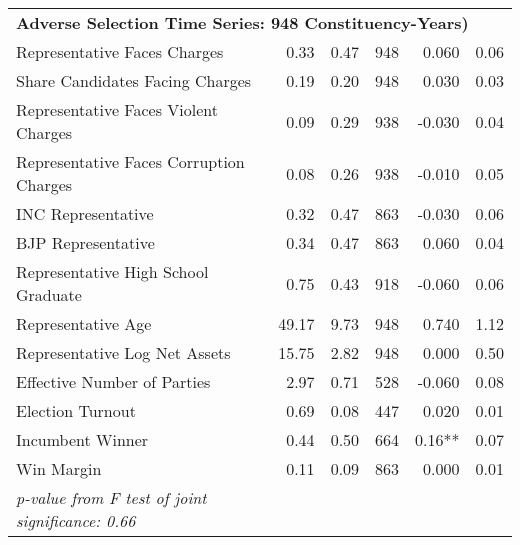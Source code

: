 \begin{tabular}{l r r r r r}
\hline
\multicolumn{6}{l}{\textbf{Adverse Selection Time Series: 948 Constituency-Years)}} \\
\quad Representative Faces Charges                                      & 0.33 & 0.47 & 948 & 0.060 & 0.06 \\
\quad Share Candidates Facing Charges                                   & 0.19   & 0.20   & 948   & 0.030   & 0.03   \\
\quad Representative Faces Violent Charges                              & 0.09       & 0.29       & 938       & -0.030       & 0.04       \\
\quad Representative Faces Corruption Charges                           & 0.08       & 0.26       & 938       & -0.010       & 0.05       \\
\quad INC Representative                                                & 0.32           & 0.47           & 863           & -0.030           & 0.06           \\
\quad BJP Representative                                                & 0.34           & 0.47           & 863           & 0.060           & 0.04           \\
\quad Representative High School Graduate                               & 0.75            & 0.43            & 918            & -0.060            & 0.06            \\
\quad Representative Age                                                & 49.17           & 9.73           & 948           & 0.740           & 1.12           \\
\quad Representative Log Net Assets                                     & 15.75        & 2.82        & 948        & 0.000        & 0.50        \\
\quad Effective Number of Parties                                       & 2.97             & 0.71             & 528             & -0.060             & 0.08             \\
\quad Election Turnout                                                  & 0.69              & 0.08              & 447              & 0.020              & 0.01              \\
\quad Incumbent Winner                                                  & 0.44                  & 0.50                  & 664                  & 0.16**                  & 0.07                  \\
\quad Win Margin                                                        & 0.11              & 0.09              & 863              & 0.000              & 0.01              \\
 \qquad \textit{p-value from F test of joint significance:  0.66} &                               &                                 &                            &                            &                             \\
 \hline
 

\end{tabular}
